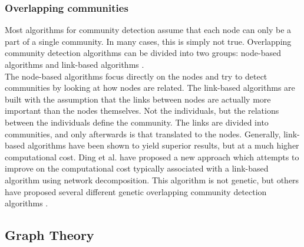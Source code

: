 \subsubsection{Overlapping communities}
Most algorithms for community detection assume that each node can only be a part of a single community. 
In many cases, this is simply not true. 
Overlapping community detection algorithms can be divided into two groups: node-based algorithms and link-based algorithms \cite{linkclus2013}.\\

The node-based algorithms focus directly on the nodes and try to detect communities by looking at how nodes are related. The link-based algorithms are built with the assumption that the links between nodes are actually more important than the nodes themselves. Not the individuals, but the relations between the individuals define the community. The links are divided into communities, and only afterwards is that translated to the nodes. Generally, link-based algorithms have been shown to yield superior results, but at a much higher computational cost. Ding et al. \cite{Ding2016} have proposed a new approach which attempts to improve on the computational cost typically associated with a link-based algorithm using network decomposition. This algorithm is not genetic,  but others have proposed several different genetic overlapping community detection algorithms \cite{linkclus2013, Pizzuti2009, Dickinson2013}.\\

\subsection{Graph Theory}


